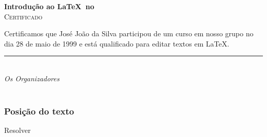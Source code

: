 \begin{frame}[plain]
  \begin{center}
    {\huge\textbf{Introdução ao \LaTeX\ no \IMPATech}}\\[2em]
    {\LARGE\textsc{Certificado}}
  \end{center}

    \noindent Certificamos que José João da Silva participou de um curso em
    nosso grupo no dia 28 de maio de 1999 e está qualificado para editar textos
    em \LaTeX.

    \vfill
    \begin{flushright}
      \rule{}{.4pt}\\
      \emph{Os Organizadores}\\
      \emph{\IMPATech}\\
    \end{flushright}
\end{frame}

\begin{frame}
  \frametitle{Posição do texto}
  \huge
  Resolver 
\end{frame}
